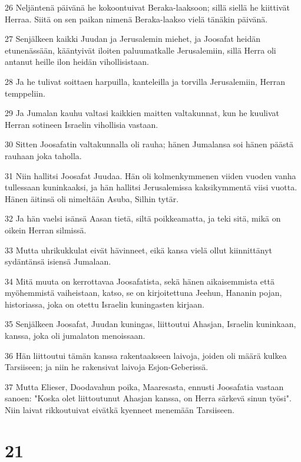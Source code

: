 \par 26 Neljäntenä päivänä he kokoontuivat Beraka-laaksoon; sillä siellä he kiittivät Herraa. Siitä on sen paikan nimenä Beraka-laakso vielä tänäkin päivänä.
\par 27 Senjälkeen kaikki Juudan ja Jerusalemin miehet, ja Joosafat heidän etunenässään, kääntyivät iloiten paluumatkalle Jerusalemiin, sillä Herra oli antanut heille ilon heidän vihollisistaan.
\par 28 Ja he tulivat soittaen harpuilla, kanteleilla ja torvilla Jerusalemiin, Herran temppeliin.
\par 29 Ja Jumalan kauhu valtasi kaikkien maitten valtakunnat, kun he kuulivat Herran sotineen Israelin vihollisia vastaan.
\par 30 Sitten Joosafatin valtakunnalla oli rauha; hänen Jumalansa soi hänen päästä rauhaan joka taholla.
\par 31 Niin hallitsi Joosafat Juudaa. Hän oli kolmenkymmenen viiden vuoden vanha tullessaan kuninkaaksi, ja hän hallitsi Jerusalemissa kaksikymmentä viisi vuotta. Hänen äitinsä oli nimeltään Asuba, Silhin tytär.
\par 32 Ja hän vaelsi isänsä Aasan tietä, siltä poikkeamatta, ja teki sitä, mikä on oikein Herran silmissä.
\par 33 Mutta uhrikukkulat eivät hävinneet, eikä kansa vielä ollut kiinnittänyt sydäntänsä isiensä Jumalaan.
\par 34 Mitä muuta on kerrottavaa Joosafatista, sekä hänen aikaisemmista että myöhemmistä vaiheistaan, katso, se on kirjoitettuna Jeehun, Hananin pojan, historiassa, joka on otettu Israelin kuningasten kirjaan.
\par 35 Senjälkeen Joosafat, Juudan kuningas, liittoutui Ahasjan, Israelin kuninkaan, kanssa, joka oli jumalaton menoissaan.
\par 36 Hän liittoutui tämän kanssa rakentaakseen laivoja, joiden oli määrä kulkea Tarsiiseen; ja niin he rakensivat laivoja Esjon-Geberissä.
\par 37 Mutta Elieser, Doodavahun poika, Maaresasta, ennusti Joosafatia vastaan sanoen: "Koska olet liittoutunut Ahasjan kanssa, on Herra särkevä sinun työsi". Niin laivat rikkoutuivat eivätkä kyenneet menemään Tarsiiseen.

\chapter{21}

